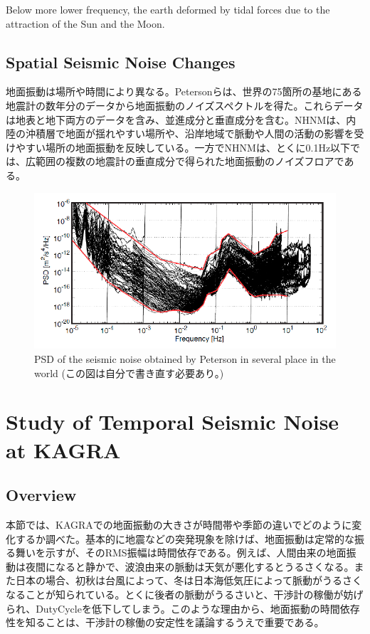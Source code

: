 Below more lower frequency, the earth deformed by tidal forces due to the attraction of the Sun and the Moon. 

\subsection{Spatial Seismic Noise Changes}
地面振動は場所や時間により異なる。Petersonらは、世界の75箇所の基地にある地震計の数年分のデータから地面振動のノイズスペクトルを得た。これらデータは地表と地下両方のデータを含み、並進成分と垂直成分を含む。NHNMは、内陸の沖積層で地面が揺れやすい場所や、沿岸地域で脈動や人間の活動の影響を受けやすい場所の地面振動を反映している。一方でNHNMは、とくに0.1Hz以下では、広範囲の複数の地震計の垂直成分で得られた地面振動のノイズフロアである。


\begin{figure}[h]
  \begin{center}   
    \includegraphics[width=12.5cm]{./img_chap3/img324.png}
    \caption{PSD of the seismic noise obtained by Peterson in several place in the world\cite{peterson1993observations} (この図は自分で書き直す必要あり。)}\label{img:img324}
  \end{center}
\end{figure}


\section{Study of Temporal Seismic Noise at KAGRA} \label{sec:33}
\subsection{Overview}
本節では、KAGRAでの地面振動の大きさが時間帯や季節の違いでどのように変化するか調べた。基本的に地震などの突発現象を除けば、地面振動は定常的な振る舞いを示すが、そのRMS振幅は時間依存である。例えば、人間由来の地面振動は夜間になると静かで、波浪由来の脈動は天気が悪化するとうるさくなる。また日本の場合、初秋は台風によって、冬は日本海低気圧によって脈動がうるさくなることが知られている\cite{}。とくに後者の脈動がうるさいと、干渉計の稼働が妨げられ、DutyCycleを低下してしまう。このような理由から、地面振動の時間依存性を知ることは、干渉計の稼働の安定性を議論するうえで重要である。


